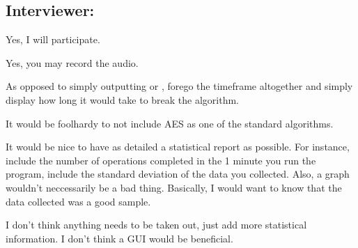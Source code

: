 \subsection{Interviewer: \md}


\begin{answer}{1}
Yes, I will participate.
\end{answer}


\begin{answer}{2}
Yes, you may record the audio.
\end{answer}


\begin{answer}{3}
As opposed to simply outputting  or , forego the
timeframe altogether and simply display how long it would
take to break the algorithm.
\end{answer}


\begin{answer}{4}
It would be foolhardy to not include AES as one of the
standard algorithms.
\end{answer}


\begin{answer}{5}
It would be nice to have as detailed a statistical report
as possible. For instance, include the number of operations
completed in the 1 minute you run the program, include the
standard deviation of the data you collected. Also, a graph
wouldn't neccessarily be a bad thing. Basically, I would want
to know that the data collected was a good sample.
\end{answer}


\begin{answer}{6}
I don't think anything needs to be taken out, just add more
statistical information. I don't think a GUI would be
beneficial.
\end{answer}

